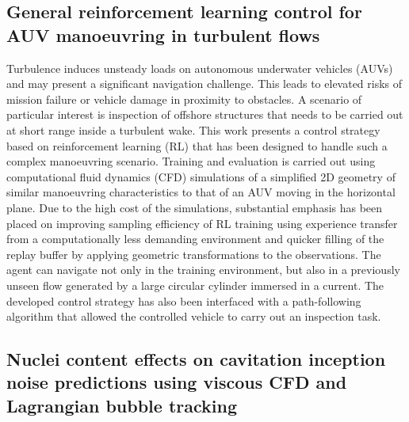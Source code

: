 \documentclass[a4paper,10pt]{article}
\begin{document}
\subsection{General reinforcement learning control for AUV manoeuvring in turbulent flows \cite{lidtke_general_2024}}

Turbulence induces unsteady loads on autonomous underwater vehicles (AUVs) and may present a significant navigation challenge. This leads to elevated risks of mission failure or vehicle damage in proximity to obstacles. A scenario of particular interest is inspection of offshore structures that needs to be carried out at short range inside a turbulent wake. This work presents a control strategy based on reinforcement learning (RL) that has been designed to handle such a complex manoeuvring scenario. Training and evaluation is carried out using computational fluid dynamics (CFD) simulations of a simplified 2D geometry of similar manoeuvring characteristics to that of an AUV moving in the horizontal plane. Due to the high cost of the simulations, substantial emphasis has been placed on improving sampling efficiency of RL training using experience transfer from a computationally less demanding environment and quicker filling of the replay buffer by applying geometric transformations to the observations. The agent can navigate not only in the training environment, but also in a previously unseen flow generated by a large circular cylinder immersed in a current. The developed control strategy has also been interfaced with a path-following algorithm that allowed the controlled vehicle to carry out an inspection task.

\subsection{Nuclei content effects on cavitation inception noise predictions using viscous CFD and Lagrangian bubble tracking \cite{lidtke_sheet_2024}}
\end{document}
